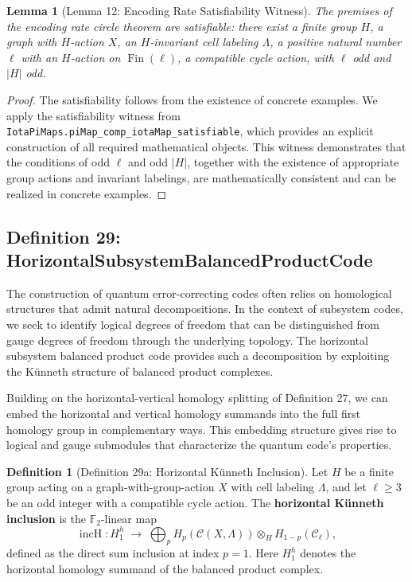 \documentclass[11pt]{article}
\theoremstyle{plain}
\newtheorem*{lemma}{Lemma}
\theoremstyle{definition}
\newtheorem*{definition}{Definition}
\theoremstyle{remark}
\begin{document}
\begin{lemma}[Lemma 12: Encoding Rate Satisfiability Witness]
The premises of the encoding rate circle theorem are satisfiable: there exist a finite group $H$, a graph with $H$-action $X$, an $H$-invariant cell labeling $\Lambda$, a positive natural number $\ell$ with an $H$-action on $\operatorname{Fin}(\ell)$, a compatible cycle action, with $\ell$ odd and $|H|$ odd.
\end{lemma}

\begin{proof}
The satisfiability follows from the existence of concrete examples. We apply the satisfiability witness from \texttt{IotaPiMaps.piMap\_comp\_iotaMap\_satisfiable}, which provides an explicit construction of all required mathematical objects. This witness demonstrates that the conditions of odd $\ell$ and odd $|H|$, together with the existence of appropriate group actions and invariant labelings, are mathematically consistent and can be realized in concrete examples.
\end{proof}

\vspace{1em}

\subsection{Definition 29: HorizontalSubsystemBalancedProductCode}

The construction of quantum error-correcting codes often relies on homological structures that admit natural decompositions. In the context of subsystem codes, we seek to identify logical degrees of freedom that can be distinguished from gauge degrees of freedom through the underlying topology. The horizontal subsystem balanced product code provides such a decomposition by exploiting the Künneth structure of balanced product complexes.

Building on the horizontal-vertical homology splitting of Definition 27, we can embed the horizontal and vertical homology summands into the full first homology group in complementary ways. This embedding structure gives rise to logical and gauge submodules that characterize the quantum code's properties.

\begin{definition}[Definition 29a: Horizontal Künneth Inclusion]
Let $H$ be a finite group acting on a graph-with-group-action $X$ with cell labeling $\Lambda$, and let $\ell \geq 3$ be an odd integer with a compatible cycle action. The \textbf{horizontal Künneth inclusion} is the $\mathbb{F}_2$-linear map
\[
  \operatorname{incH} : H_1^h \;\longrightarrow\; \bigoplus_{p} H_p(\mathcal{C}(X,\Lambda)) \otimes_H H_{1-p}(\mathcal{C}_\ell),
\]
defined as the direct sum inclusion at index $p = 1$. Here $H_1^h$ denotes the horizontal homology summand of the balanced product complex.
\end{definition}
\end{document}
